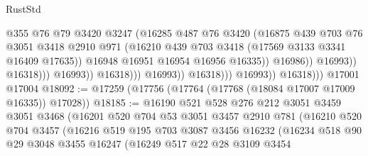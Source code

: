 \begin{lexlean}{RustStd}
\begin{coremodule}
                                                @355
                                                @76
                                                @79
                                                @3420
                                                @3247
                                                (@16285
                                                  @487
                                                  @76
                                                  @3420
                                                  (@16875
                                                    @439
                                                    @703
                                                    @76
                                                    @3051
                                                    @3418
                                                    @2910
                                                    @971
                                                    (@16210
                                                      @439
                                                      @703
                                                      @3418
                                                      (@17569 @3133 @3341 @16409 @17635))
                                                    @16948
                                                    @16951
                                                    @16954
                                                    @16956
                                                    @16335))
                                                @16986))
                                            @16993))
                                        @16318)))
                                  @16993))
                              @16318)))
                        @16993))
                    @16318)))
              @16993))
          @16318)))
    @17001
    @17004
@18092 := @17259 (@17756 (@17764 (@17768 (@18084 @17007 @17009 @16335)) @17028))
@18185 := @16190
    @521
    @528
    @276
    @212
    @3051
    @3459
    @3051
    @3468
    (@16201
      @520
      @704
      @53
      @3051
      @3457
      @2910
      @781
      (@16210
        @520
        @704
        @3457
        (@16216
          @519
          @195
          @703
          @3087
          @3456
          @16232
          (@16234
            @518
            @90
            @29
            @3048
            @3455
            @16247
            (@16249
              @517
              @22
              @28
              @3109
              @3454

\end{coremodule}
\end{lexlean}
